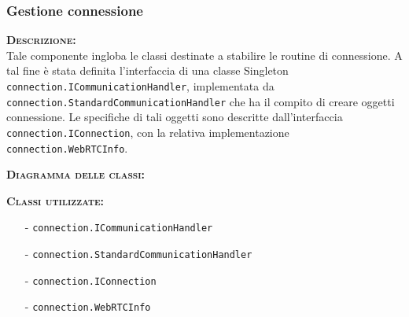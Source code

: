 \subsubsection{Gestione connessione}
\begin{description}
	\item{\scshape\bfseries Descrizione:}\\
Tale componente ingloba le classi destinate a stabilire le routine di connessione. A tal fine è stata definita l'interfaccia di una classe Singleton \texttt{connection.ICommunicationHandler}, implementata da \texttt{connection.StandardCommunicationHandler} che ha il compito di creare oggetti connessione. Le specifiche di tali oggetti sono descritte dall'interfaccia \texttt{connection.IConnection}, con la relativa implementazione \texttt{connection.WebRTCInfo}.
	\item{\scshape\bfseries Diagramma delle classi:}
	\item{\scshape\bfseries Classi utilizzate:}
	\begin{itemize}[nolistsep, noitemsep]
	  \item[-] \texttt{connection.ICommunicationHandler}
	  \item[-] \texttt{connection.StandardCommunicationHandler}
	  \item[-] \texttt{connection.IConnection}
	  \item[-] \texttt{connection.WebRTCInfo}
	\end{itemize}
\end{description}

